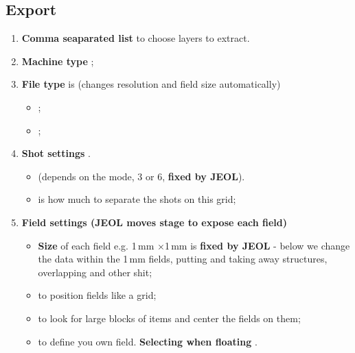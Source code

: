\subsection{Export}
\begin{enumerate}
\item \textbf{Comma seaparated list} to choose layers to extract.
\item \textbf{Machine type} ;
\item \textbf{File type} is  (changes resolution and field size automatically)
  \begin{itemize}
  \item {} \hfill {};
  \item  {}  \hfill  {};
  \end{itemize}
\item \textbf{Shot settings} \hfill {}.
  \begin{itemize}
  \item  {}  (depends on  the  mode, 3  or  6, \textbf{fixed  by
      JEOL}). 
  \item {} is how much to separate the shots on this grid;
  \end{itemize}
\item \textbf{Field settings (JEOL moves stage to expose each field)}
  \begin{itemize}
  \item \textbf{Size} of each  field e.g.  1\,mm $ \times $1\,mm is \textbf{fixed  by JEOL} - below
    we  change  the  data  within  the  1\,mm fields,  putting  and  taking  away  structures,
    overlapping and other shit;
  \item {} to position fields like a grid;
  \item {}  to look  for large blocks  of items and  center the
    fields on them;
  \item {} to define  you own field.  \textbf{Selecting
      when floating} .  
\end{itemize}
\end{enumerate}
